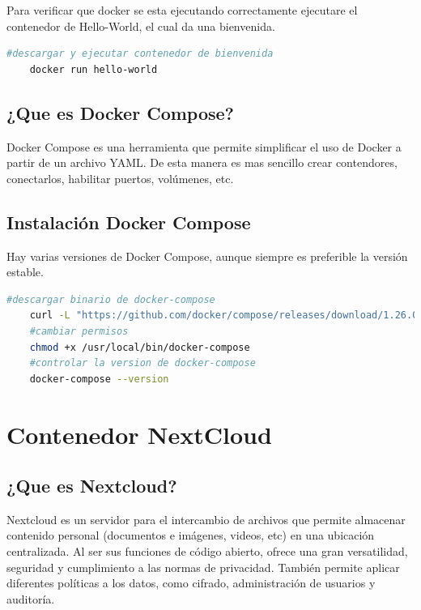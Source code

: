 			Para verificar que docker se esta ejecutando correctamente ejecutare el contenedor de Hello-World, el cual da una bienvenida.
	
			\begin{lstlisting}[language=Bash,caption=Hello-World]
	#descargar y ejecutar contenedor de bienvenida
	docker run hello-world
			\end{lstlisting}
		
		\subsection{¿Que es Docker Compose?}
		
			Docker Compose es una herramienta que permite simplificar el uso de Docker a partir de un archivo YAML. De esta manera es mas sencillo crear contendores, conectarlos, habilitar puertos, volúmenes, etc.\par 
		
		\subsection{Instalación Docker Compose}
			
			\vspace{0.2cm}
			
			Hay varias versiones de Docker Compose, aunque siempre es preferible la versión estable.

									
			\begin{lstlisting}[language=Bash,caption=Docker Compose]
	#descargar binario de docker-compose	
	curl -L "https://github.com/docker/compose/releases/download/1.26.0/docker-compose-$(uname -s)-$(uname -m)" -o /usr/local/bin/docker-compose
	#cambiar permisos
	chmod +x /usr/local/bin/docker-compose
	#controlar la version de docker-compose
	docker-compose --version
			\end{lstlisting}
				
				
	\section{Contenedor NextCloud}
		
		\subsection{¿Que es Nextcloud?}
		
			Nextcloud es un servidor para el intercambio de archivos que permite almacenar contenido personal (documentos e imágenes, videos, etc) en una ubicación centralizada. Al ser sus funciones de código abierto, ofrece una gran versatilidad, seguridad y cumplimiento a las normas de privacidad. También permite aplicar diferentes políticas a los datos, como cifrado, administración de usuarios y auditoría.\par
		
